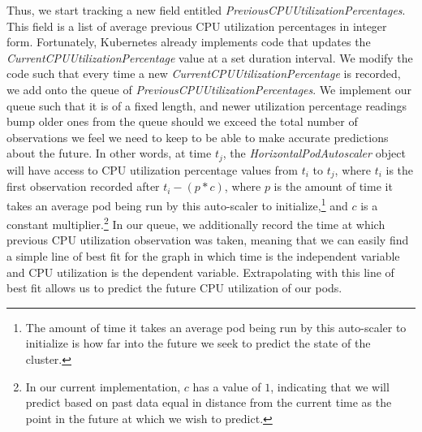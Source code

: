 Thus, we start tracking a new field entitled
\textit{PreviousCPUUtilizationPercentages}. This field is a list of average previous CPU
utilization percentages in integer form. Fortunately, Kubernetes already
implements code that updates the \textit{CurrentCPUUtilizationPercentage} value
at a set duration interval. We modify the code such that every time a new
\textit{CurrentCPUUtilizationPercentage} is recorded, we add onto the queue of
\textit{PreviousCPUUtilizationPercentages}. We implement our queue such that it
is of a fixed length, and newer utilization percentage readings bump older ones
from the queue should we exceed the total number of observations we feel we need
to keep to be able to make accurate predictions about the future. In other words, at time
$t_{j}$, the \textit{HorizontalPodAutoscaler} object will have access to
CPU utilization percentage values from $t_{i}$ to $t_{j}$, where $t_{i}$ is the
first observation recorded after $t_{i} - (p * c)$, where $p$ is the
amount of time it takes an
average pod being run by this auto-scaler to initialize,\footnote{The
amount of time it takes an
average pod being run by this auto-scaler to initialize is how far into the
future we seek to predict the state of the cluster.} and $c$ is a constant
multiplier.\footnote{In our current implementation, $c$ has a value of
$1$, indicating that we will predict based on past data equal in distance from
the current time as the point in the future at which we wish to predict.}
In our queue, we additionally record the time at which previous CPU utilization
observation was taken, meaning that we can easily find a simple line of best fit
for the graph in which time is the independent variable and CPU utilization is
the dependent variable. Extrapolating with this line of best fit allows us to
predict the future CPU utilization of our pods.
